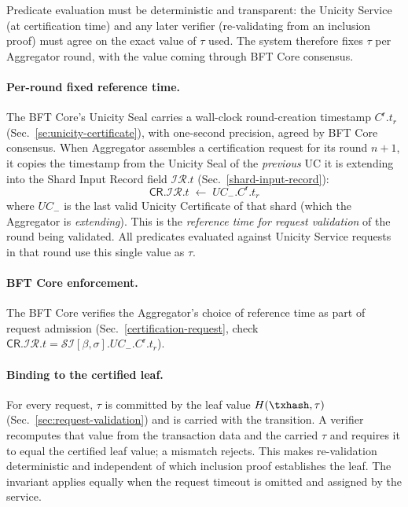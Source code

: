 \index{$\tau$}
Predicate evaluation must be deterministic and transparent: the Unicity Service (at certification time) and any later verifier (re-validating from an inclusion proof) must agree on the exact value of $\tau$ used. The system therefore fixes $\tau$ per Aggregator round, with the value coming through BFT Core consensus.

\paragraph{Per-round fixed reference time.}
The BFT Core's Unicity Seal carries a wall-clock round-creation timestamp $C^\mathsf{r}.t_r$ (Sec.~\ref{se:unicity-certificate}), with one-second precision, agreed by BFT Core consensus. When Aggregator assembles a certification request for its round $n{+}1$, it copies the timestamp from the Unicity Seal of the \emph{previous} UC it is extending into the Shard Input Record field $\mathcal{IR}.t$ (Sec.~\ref{shard-input-record}):
\[
	\mathsf{CR}.\mathcal{IR}.t \;\gets\; UC_-.C^\mathsf{r}.t_r
\]
where $UC_-$ is the last valid Unicity Certificate of that shard (which the Aggregator is \emph{extending}). This is the \emph{reference time for request validation} of the round being validated. All predicates evaluated against Unicity Service requests in that round use this single value as $\tau$.

\paragraph{BFT Core enforcement.}
The BFT Core verifies the Aggregator's choice of reference time as part of request admission (Sec.~\ref{certification-request}, check $\mathsf{CR}.\mathcal{IR}.t = \mathcal{SI}[\beta,\sigma].UC_-.C^\mathsf{r}.t_r$).

\paragraph{Binding to the certified leaf.}
For every request, $\tau$ is committed by the leaf value $H(\txhash, \tau)$ (Sec.~\ref{sec:request-validation}) and is carried with the transition. A verifier recomputes that value from the transaction data and the carried $\tau$ and requires it to equal the certified leaf value; a mismatch rejects. This makes re-validation deterministic and independent of which inclusion proof establishes the leaf. The invariant applies equally when the request timeout is omitted and assigned by the service.

